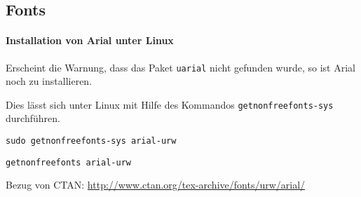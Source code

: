 \documentclass[cmyk,a4paper,11pt,colorscheme=green,TUBStitlepage=picture]{tubsreprt}
\begin{document}
\subsection{}

\subsection{Fonts}

\paragraph{Installation von Arial unter Linux}

Erscheint die Warnung, dass das Paket \lstinline{uarial} nicht gefunden wurde,
so ist Arial noch zu installieren.

Dies lässt sich unter Linux mit Hilfe des Kommandos
\lstinline{getnonfreefonts-sys} durchführen.

\begin{lstlisting}
sudo getnonfreefonts-sys arial-urw
\end{lstlisting}

\begin{lstlisting}
getnonfreefonts arial-urw
\end{lstlisting}

Bezug von CTAN: \url{http://www.ctan.org/tex-archive/fonts/urw/arial/}

\end{document}

